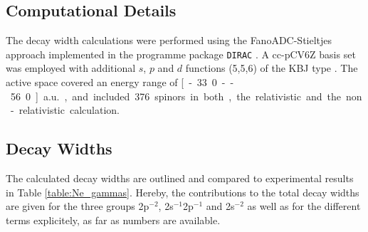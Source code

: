 \subsection{Computational Details}
The decay width calculations were performed using the FanoADC-Stieltjes approach
implemented in the programme package \verb|DIRAC| \cite{DIRAC13}.
A cc-pCV6Z basis set was employed with
additional $s$, $p$ and $d$ functions (5,5,6) of the \ac{KBJ} type \cite{Kaufmann89}.
The active space covered an energy range of \unit[-33.0 -- 56.0]{a.u.}, and included
376 spinors in both, the relativistic and the non-relativistic calculation.

\subsection{Decay Widths}
The calculated decay widths are outlined and compared to experimental
results in Table \ref{table:Ne_gammas}. Hereby, the contributions to the
total decay widths are given
for the three groups 2p$^{-2}$, 2s$^{-1}$2p$^{-1}$ and 2s$^{-2}$ as well
as for the different terms explicitely, as far as numbers are available.

